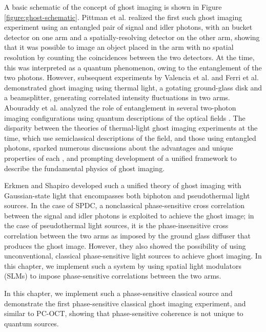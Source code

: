 A basic schematic of the concept of ghost imaging is shown in Figure \ref{figure:ghost-schematic}. Pittman et al. realized the first such ghost imaging experiment \cite{pittman-ghost} using an entangled pair of signal and idler photons, with an bucket detector on one arm and a spatially-resolving detector on the other arm, showing that it was possible to image an object placed in the arm with no spatial resolution by counting the coincidences between the two detectors. At the time, this was interpreted as a quantum phenomenon, owing to the entanglement of the two photons. However, subsequent experiments by Valencia et al. \cite{valencia-two} and Ferri et al. \cite{ferri-high} demonstrated ghost imaging using thermal light, a gotating ground-glass disk and a beamsplitter, generating correlated intensity fluctuations in two arms. Abouraddy et al. analyzed the role of entanglement in several two-photon imaging configurations using quantum descriptions of the optical fields \cite{abouraddy-role,abouraddy-fourier}. The disparity between the theories of thermal-light ghost imaging experiments at the time, which use semiclassical descriptions of the field, and those using entangled photons, sparked numerous discussions about the advantages and unique properties of each \cite{dangelo-identifying,bennink-quantum,gatti-entangled}, and prompting development of a unified framework to describe the fundamental physics of ghost imaging.

Erkmen and Shapiro developed such a unified theory of ghost imaging with Gaussian-state light \cite{erkmen-unified} that encompasses both biphoton and pseudothermal light sources. In the case of SPDC, a nonclassical phase-sensitive cross correlation between the signal and idler photons is exploited to achieve the ghost image; in the case of pseudothermal light sources, it is the phase-insensitive cross correlation between the two arms as imposed by the ground glass diffuser that produces the ghost image. However, they also showed the possibility of using unconventional, classical phase-sensitive light sources to achieve ghost imaging. In this chapter, we implement such a system by using spatial light modulators (SLMs) to impose phase-sensitive correlations between the two arms.

In this chapter, we implement such a phase-sensitive classical source and demonstrate the first phase-sensitive classical ghost imaging experiment, and similar to PC-OCT, showing that phase-sensitive coherence is not unique to quantum sources.

